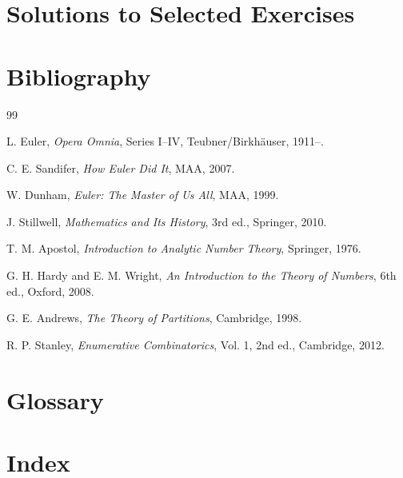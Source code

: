 \documentclass[11pt,a4paper,twoside]{book}
\theoremstyle{eulerstyle}
\theoremstyle{definition}
\begin{document}
\cleardoublepage

\chapter{Solutions to Selected Exercises}
\label{app:solutions}


\cleardoublepage

\chapter*{Bibliography}

\begin{thebibliography}{99}

L. Euler, \textit{Opera Omnia}, Series I--IV, Teubner/Birkh\"auser, 1911--.

C. E. Sandifer, \textit{How Euler Did It}, MAA, 2007.

W. Dunham, \textit{Euler: The Master of Us All}, MAA, 1999.

J. Stillwell, \textit{Mathematics and Its History}, 3rd ed., Springer, 2010.

T. M. Apostol, \textit{Introduction to Analytic Number Theory}, Springer, 1976.

G. H. Hardy and E. M. Wright, \textit{An Introduction to the Theory of Numbers}, 6th ed., Oxford, 2008.

G. E. Andrews, \textit{The Theory of Partitions}, Cambridge, 1998.

R. P. Stanley, \textit{Enumerative Combinatorics}, Vol. 1, 2nd ed., Cambridge, 2012.

\end{thebibliography}

\cleardoublepage

\chapter*{Glossary}


\cleardoublepage

\chapter*{Index}
\end{document}
